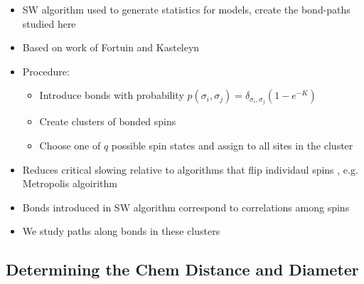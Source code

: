 \documentclass{umthesis}          %
\begin{document}
\begin{itemize}

\item SW algorithm \cite{SwWA} used to generate statistics for models, create the bond-paths studied here\\
\label{sec-4.2.1.1}


\item Based on work of Fortuin and Kasteleyn \cite{FoKa}\\
\label{sec-4.2.1.2}


\item Procedure:\\
\label{sec-4.2.1.3}

\begin{itemize}

\item Introduce bonds with probability $p(\sigma_i,\sigma_j) = \delta_{\sigma_i, \sigma_j} (1-e^{-K})$\\
\label{sec-4.2.1.3.1}


\item Create clusters of bonded spins\\
\label{sec-4.2.1.3.2}


\item Choose one of $q$ possible spin states and assign to all sites in the cluster\\
\label{sec-4.2.1.3.3}

\end{itemize} %

\item Reduces critical slowing relative to algorithms that flip individaul spins \cite{NeBa99}, e.g. Metropolis algoirithm \cite{Met}\\
\label{sec-4.2.1.4}


\item Bonds introduced in SW algorithm correspond to correlations among spins\\
\label{sec-4.2.1.5}


\item We study paths along bonds in these clusters\\
\label{sec-4.2.1.6}

\end{itemize} %
\subsection{Determining the Chem Distance and Diameter}
\label{sec-4.2.2}
\end{document}
